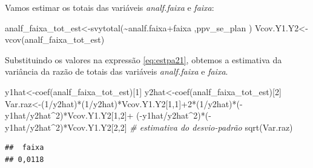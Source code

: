 \documentclass[
  12pt,
  brazilian,
]{book}
\newenvironment{Shaded}{\begin{snugshade}}{\end{snugshade}}
\newcommand{\CommentTok}[1]{\textcolor[rgb]{0.56,0.35,0.01}{\textit{#1}}}
\newcommand{\DecValTok}[1]{\textcolor[rgb]{0.00,0.00,0.81}{#1}}
\newcommand{\FunctionTok}[1]{\textcolor[rgb]{0.00,0.00,0.00}{#1}}
\newcommand{\NormalTok}[1]{#1}
\newcommand{\OtherTok}[1]{\textcolor[rgb]{0.56,0.35,0.01}{#1}}
\newcommand{\SpecialCharTok}[1]{\textcolor[rgb]{0.00,0.00,0.00}{#1}}
\theoremstyle{definition}
\theoremstyle{definition}
\theoremstyle{definition}
\theoremstyle{definition}
\theoremstyle{remark}
\begin{document}
Vamos estimar os totais das variáveis \emph{analf.faixa} e \emph{faixa}:

\begin{Shaded}
\begin{Highlighting}[]
\NormalTok{analf\_faixa\_tot\_est}\OtherTok{\textless{}{-}}\FunctionTok{svytotal}\NormalTok{(}\SpecialCharTok{\textasciitilde{}}\NormalTok{analf.faixa}\SpecialCharTok{+}\NormalTok{faixa ,ppv\_se\_plan )}
\NormalTok{Vcov.Y1.Y2}\OtherTok{\textless{}{-}}\FunctionTok{vcov}\NormalTok{(analf\_faixa\_tot\_est) }
\end{Highlighting}
\end{Shaded}

Substituindo os valores na expressão \eqref{eq:estpa21}, obtemos a estimativa da variância da razão de totais das variáveis \emph{analf.faixa} e \emph{faixa}.

\begin{Shaded}
\begin{Highlighting}[]
\NormalTok{y1hat}\OtherTok{\textless{}{-}}\FunctionTok{coef}\NormalTok{(analf\_faixa\_tot\_est)[}\DecValTok{1}\NormalTok{]}
\NormalTok{y2hat}\OtherTok{\textless{}{-}}\FunctionTok{coef}\NormalTok{(analf\_faixa\_tot\_est)[}\DecValTok{2}\NormalTok{]}
\NormalTok{Var.raz}\OtherTok{\textless{}{-}}\NormalTok{(}\DecValTok{1}\SpecialCharTok{/}\NormalTok{y2hat)}\SpecialCharTok{*}\NormalTok{(}\DecValTok{1}\SpecialCharTok{/}\NormalTok{y2hat)}\SpecialCharTok{*}\NormalTok{Vcov.Y1.Y2[}\DecValTok{1}\NormalTok{,}\DecValTok{1}\NormalTok{]}\SpecialCharTok{+}\DecValTok{2}\SpecialCharTok{*}\NormalTok{(}\DecValTok{1}\SpecialCharTok{/}\NormalTok{y2hat)}\SpecialCharTok{*}\NormalTok{(}\SpecialCharTok{{-}}\NormalTok{y1hat}\SpecialCharTok{/}\NormalTok{y2hat}\SpecialCharTok{\^{}}\DecValTok{2}\NormalTok{)}\SpecialCharTok{*}\NormalTok{Vcov.Y1.Y2[}\DecValTok{1}\NormalTok{,}\DecValTok{2}\NormalTok{]}\SpecialCharTok{+}
\NormalTok{(}\SpecialCharTok{{-}}\NormalTok{y1hat}\SpecialCharTok{/}\NormalTok{y2hat}\SpecialCharTok{\^{}}\DecValTok{2}\NormalTok{)}\SpecialCharTok{*}\NormalTok{(}\SpecialCharTok{{-}}\NormalTok{y1hat}\SpecialCharTok{/}\NormalTok{y2hat}\SpecialCharTok{\^{}}\DecValTok{2}\NormalTok{)}\SpecialCharTok{*}\NormalTok{Vcov.Y1.Y2[}\DecValTok{2}\NormalTok{,}\DecValTok{2}\NormalTok{]}
\CommentTok{\# estimativa do desvio{-}padrão}
\FunctionTok{sqrt}\NormalTok{(Var.raz)}
\end{Highlighting}
\end{Shaded}

\begin{verbatim}
##  faixa 
## 0,0118
\end{verbatim}
\end{document}
